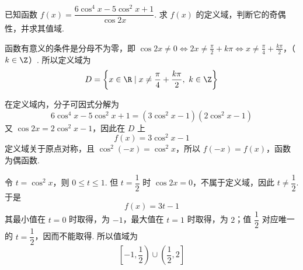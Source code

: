 \begin{problem}
已知函数 \(f(x)=\dfrac{6\cos^4x-5\cos^2x+1}{\cos 2x}\).
求 \(f(x)\) 的定义域，判断它的奇偶性，并求其值域.

\begin{solution}
函数有意义的条件是分母不为零，即
\(\cos 2x\neq0 \Longleftrightarrow 2x\neq\frac{\pi}{2}+k\pi \Longleftrightarrow x\neq\frac{\pi}{4}+\frac{k\pi}{2}\)，（\(k\in\Z\)）.
所以定义域为
\[
D=\left\{x\in\R\mid x\neq\frac{\pi}{4}+\frac{k\pi}{2},\ k\in\Z\right\}
\]

在定义域内，分子可因式分解为
\[
6\cos^4x-5\cos^2x+1=(3\cos^2x-1)(2\cos^2x-1)
\]
又 \(\cos 2x=2\cos^2x-1\)，因此在 \(D\) 上
\[
f(x)=3\cos^2x-1
\]
定义域关于原点对称，且 \(\cos^2(-x)=\cos^2x\)，所以 \(f(-x)=f(x)\)，函数为偶函数.

令 \(t=\cos^2x\)，则 \(0\leqslant t\leqslant1\). 但 \(t=\dfrac12\) 时 \(\cos 2x=0\)，不属于定义域，因此 \(t\neq\dfrac12\). 于是
\[
f(x)=3t-1
\]
其最小值在 \(t=0\) 时取得，为 \(-1\)，最大值在 \(t=1\) 时取得，为 \(2\)；值 \(\dfrac12\) 对应唯一的 \(t=\dfrac12\)，因而不能取得. 所以值域为
\[
\left[-1,\frac12\right)\cup\left(\frac12,2\right]
\]
\end{solution}
\end{problem}


